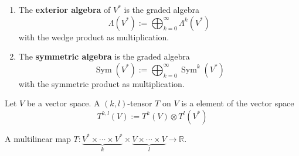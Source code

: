 \documentclass[12pt, oneside]{book}
\begin{document}
\begin{definition}
    \begin{enumerate}
        \item
              The \textbf{exterior algebra} of $V^*$ is the graded algebra
              \begin{equation*}
                  \Lambda(V^*)
                  :=
                  \bigoplus_{k=0}^\infty \Lambda^k(V^*)
              \end{equation*}
              with the wedge product as multiplication.

        \item
              The \textbf{symmetric algebra} is the graded algebra
              \begin{equation*}
                  \operatorname{Sym}(V^*)
                  :=
                  \bigoplus_{k=0}^\infty \operatorname{Sym}^k(V^*)
              \end{equation*}
              with the symmetric product as multiplication.
    \end{enumerate}
\end{definition}






\begin{definition}
    Let $V$ be a vector space. A $(k,l)$-tensor $T$ on $V$ is a element of the vector space
    \begin{equation*}
        T^{k,l}(V)
        :=
        T^k(V) \otimes T^l\left(V^*\right)
    \end{equation*}

    \begin{remark}
        A multilinear map $T: \underbrace{V^* \times \cdots \times V^*}_{k} \times \underbrace{V \times \cdots \times V}_{l} \rightarrow \mathbb{R}$.
    \end{remark}
\end{definition}
\end{document}
